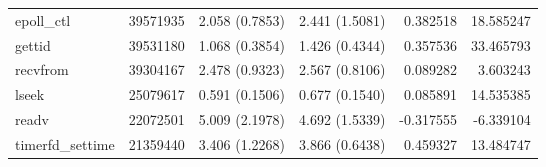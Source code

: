 \begin{tabular}{>{\ttfamily}lrrrrr}
                     epoll\_ctl &    39571935 &           2.058 (0.7853) &           2.441 (1.5081) &        0.382518 &    18.585247 \\
                         gettid &    39531180 &           1.068 (0.3854) &           1.426 (0.4344) &        0.357536 &    33.465793 \\
                       recvfrom &    39304167 &           2.478 (0.9323) &           2.567 (0.8106) &        0.089282 &     3.603243 \\
                          lseek &    25079617 &           0.591 (0.1506) &           0.677 (0.1540) &        0.085891 &    14.535385 \\
                          readv &    22072501 &           5.009 (2.1978) &           4.692 (1.5339) &       -0.317555 &    -6.339104 \\
               timerfd\_settime &    21359440 &           3.406 (1.2268) &           3.866 (0.6438) &        0.459327 &    13.484747 \\
\bottomrule
\end{tabular}
